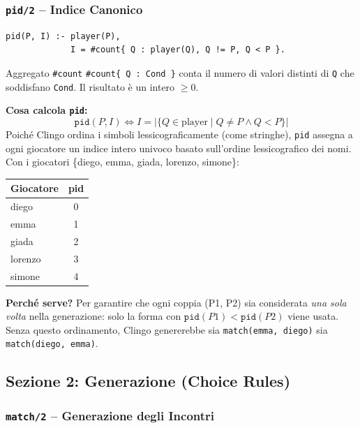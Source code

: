 \documentclass[12pt,a4paper]{article}
\begin{document}
\subsubsection{\texttt{pid/2} -- Indice Canonico}

\begin{lstlisting}
pid(P, I) :- player(P),
             I = #count{ Q : player(Q), Q != P, Q < P }.
\end{lstlisting}

\begin{defbox}{Aggregato \texttt{\#count}}
\texttt{\#count\{ Q : Cond \}} conta il numero di valori distinti di \texttt{Q}
che soddisfano \texttt{Cond}. Il risultato è un intero $\ge 0$.
\end{defbox}

\textbf{Cosa calcola \texttt{pid}:}
\[
  \texttt{pid}(P, I) \iff I = |\{Q \in \text{player} \mid Q \neq P \land Q < P\}|
\]
Poiché Clingo ordina i simboli lessicograficamente (come stringhe), \texttt{pid}
assegna a ogni giocatore un indice intero univoco basato sull'ordine
lessicografico dei nomi. Con i giocatori \{diego, emma, giada, lorenzo, simone\}:

\begin{center}
\begin{tabular}{lc}
\toprule
\textbf{Giocatore} & \textbf{pid} \\
\midrule
diego & 0 \\
emma & 1 \\
giada & 2 \\
lorenzo & 3 \\
simone & 4 \\
\bottomrule
\end{tabular}
\end{center}

\textbf{Perché serve?} Per garantire che ogni coppia (P1, P2) sia considerata
\emph{una sola volta} nella generazione: solo la forma con
$\texttt{pid}(P1) < \texttt{pid}(P2)$ viene usata. Senza questo ordinamento,
Clingo genererebbe sia \texttt{match(emma, diego)} sia \texttt{match(diego, emma)}.

\subsection{Sezione 2: Generazione (Choice Rules)}

\subsubsection{\texttt{match/2} -- Generazione degli Incontri}
\end{document}
